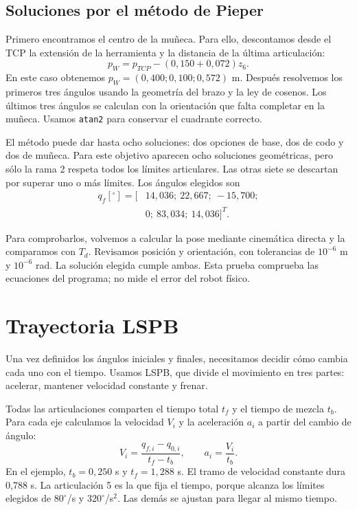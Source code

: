 \documentclass[conference]{IEEEtran}
\begin{document}
\subsection{Soluciones por el método de Pieper}
Primero encontramos el centro de la muñeca. Para ello, descontamos desde el TCP la extensión de la herramienta y la distancia de la última articulación:
\begin{equation}
p_W=p_{TCP}-(0{,}150+0{,}072)z_6.
\end{equation}
En este caso obtenemos $p_W=(0{,}400;0{,}100;0{,}572)$ m. Después resolvemos los primeros tres ángulos usando la geometría del brazo y la ley de cosenos. Los últimos tres ángulos se calculan con la orientación que falta completar en la muñeca. Usamos \texttt{atan2} para conservar el cuadrante correcto.

El método puede dar hasta ocho soluciones: dos opciones de base, dos de codo y dos de muñeca. Para este objetivo aparecen ocho soluciones geométricas, pero sólo la rama 2 respeta todos los límites articulares. Las otras siete se descartan por superar uno o más límites. Los ángulos elegidos son
\begin{equation}
\begin{split}
q_f[{}^\circ]=[&14{,}036;\ 22{,}667;\ -15{,}700;\\
&0;\ 83{,}034;\ 14{,}036]^T.
\end{split}
\end{equation}

Para comprobarlos, volvemos a calcular la pose mediante cinemática directa y la comparamos con $T_d$. Revisamos posición y orientación, con tolerancias de $10^{-6}$ m y $10^{-6}$ rad. La solución elegida cumple ambas. Esta prueba comprueba las ecuaciones del programa; no mide el error del robot físico.

\section{Trayectoria LSPB}
Una vez definidos los ángulos iniciales y finales, necesitamos decidir cómo cambia cada uno con el tiempo. Usamos LSPB, que divide el movimiento en tres partes: acelerar, mantener velocidad constante y frenar.

Todas las articulaciones comparten el tiempo total $t_f$ y el tiempo de mezcla $t_b$. Para cada eje calculamos la velocidad $V_i$ y la aceleración $a_i$ a partir del cambio de ángulo:
\begin{equation}
V_i=\frac{q_{f,i}-q_{0,i}}{t_f-t_b},\qquad a_i=\frac{V_i}{t_b}.
\end{equation}
En el ejemplo, $t_b=0{,}250$ s y $t_f=1{,}288$ s. El tramo de velocidad constante dura 0,788 s. La articulación 5 es la que fija el tiempo, porque alcanza los límites elegidos de $80^\circ$/s y $320^\circ$/s$^2$. Las demás se ajustan para llegar al mismo tiempo.
\end{document}
